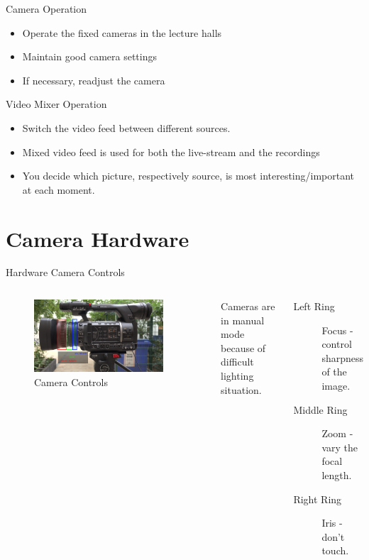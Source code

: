 \documentclass[aspectratio=169]{beamer}
\begin{document}
\begin{frame}{Camera Operation}
	\begin{itemize}
		\item Operate the fixed cameras in the lecture halls
		\item Maintain good camera settings
		\item If necessary, readjust the camera
	\end{itemize}
\end{frame}

\begin{frame}{Video Mixer Operation}
	\begin{itemize}
		\item Switch the video feed between different sources. 
		\item Mixed video feed is used for both the live-stream and the recordings 
		\item You decide which picture, respectively source, is most interesting/important at each moment.
	\end{itemize}
\end{frame}



\section{Camera Hardware}
\begin{frame}{Hardware Camera Controls}
	\begin{columns}[T,onlytextwidth]
		\begin{figure} 
			\centering
			\includegraphics[width=0.9\textwidth]{images/panasonic_seitenansicht_objektiv.png}
			\caption{Camera Controls}
		\end{figure}
		Cameras are in manual mode because of difficult lighting situation.
		\begin{description}
			\item[Left Ring] Focus - control sharpness of the image.
			\item[Middle Ring] Zoom - vary the focal length.
			\item[Right Ring] Iris - don't touch.
		\end{description}
	\end{columns}
\end{frame}
\end{document}
